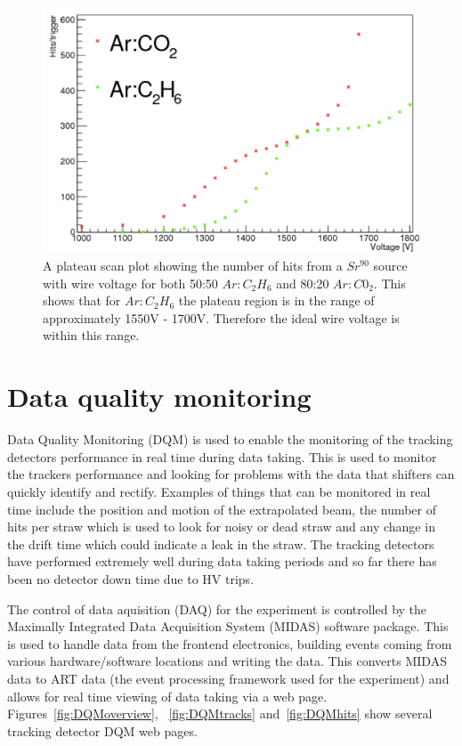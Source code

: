 \begin{figure}[th]
\centering
\includegraphics[scale=0.8]{Figures/plateau}
\decoRule
\caption{A plateau scan plot showing the number of hits from a $Sr^{90}$ source with wire voltage for both 50:50 $Ar:C_{2}H_{6}$ and 80:20 $Ar:C0_{2}$. This shows that for $Ar:C_{2}H_{6}$ the plateau region is in the range of approximately 1550V - 1700V. Therefore the ideal wire voltage is within this range.}
\label{fig:plateau}
\end{figure}

\section{Data quality monitoring}

Data Quality Monitoring (DQM) is used to enable the monitoring of the tracking detectors performance in real time during data taking. This is used to monitor the trackers performance and looking for problems with the data that shifters can quickly identify and rectify. Examples of things that can be monitored in real time include the position and motion of the extrapolated beam, the number of hits per straw which is used to look for noisy or dead straw and any change in the drift time which could indicate a leak in the straw. The tracking detectors have performed extremely well during data taking periods and so far there has been no detector down time due to HV trips. 

The control of data aquisition (DAQ) for the experiment is controlled by the Maximally Integrated Data Acquisition System (MIDAS) software package. This is used to handle data from the frontend electronics, building events coming from various hardware/software locations and writing the data. This converts MIDAS data to ART data (the event processing framework used for the experiment) and allows for real time viewing of data taking via a web page. Figures~\ref{fig:DQMoverview}, ~\ref{fig:DQMtracks} and~\ref{fig:DQMhits} show several tracking detector DQM web pages.


